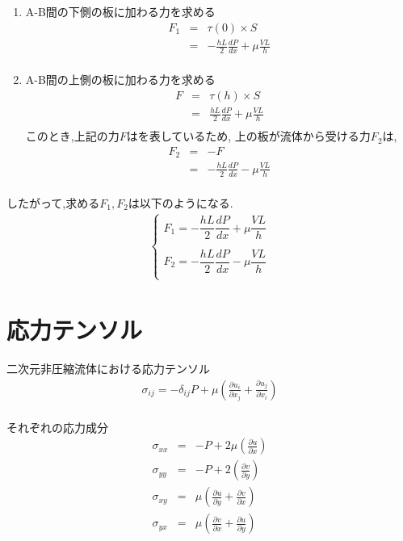 \documentclass[a4paper]{jsarticle}
\begin{document}
\begin{enumerate}[(1)]
    \item A-B間の下側の板に加わる力を求める\\
          \begin{eqnarray*}
              F_1&=&\tau\left(0\right)\times S\\
              &=&-\frac{hL}{2}\frac{dP}{dx}+\mu\frac{VL}{h}\\
          \end{eqnarray*}
    \item A-B間の上側の板に加わる力を求める\\
          \begin{eqnarray*}
              F&=&\tau\left(h\right)\times S\\
              &=&\frac{hL}{2}\frac{dP}{dx}+\mu\frac{VL}{h}\\
          \end{eqnarray*}
          このとき,上記の力$F$はを表しているため,
          上の板が流体から受ける力$F_2$は,
          \begin{eqnarray*}
              F_2&=&-F\\
              &=&-\frac{hL}{2}\frac{dP}{dx}-\mu\frac{VL}{h}\\
          \end{eqnarray*}
\end{enumerate}
したがって,求める$F_1,F_2$は以下のようになる.
\begin{eqnarray*}
    \begin{cases}
        F_1=-\dfrac{hL}{2}\dfrac{dP}{dx}+\mu\dfrac{VL}{h} \\
        \\
        F_2=-\dfrac{hL}{2}\dfrac{dP}{dx}-\mu\dfrac{VL}{h} \\
    \end{cases}
\end{eqnarray*}
\section{応力テンソル}
\begin{itembox}[l]{二次元非圧縮流体における応力テンソル}
    \begin{eqnarray*}
        \sigma_{ij}=-\delta_{ij}P+\mu\left(\frac{\partial u_i}{\partial x_j}+\frac{\partial u_j}{\partial x_i}\right)\\
    \end{eqnarray*}
\end{itembox}
\begin{itembox}[l]{それぞれの応力成分}
    \begin{eqnarray*}
        \sigma_{xx} &=& -P+2\mu\left(\frac{\partial u}{\partial x}\right)\\
        \sigma_{yy} &=& -P+2\left(\frac{\partial v}{\partial y}\right)\\
        \sigma_{xy} &=& \mu\left(\frac{\partial u}{\partial y}+\frac{\partial v}{\partial x}\right)\\
        \sigma_{yx} &=& \mu\left(\frac{\partial v}{\partial x}+\frac{\partial u}{\partial y}\right)\\
    \end{eqnarray*}
\end{itembox}
\end{document}
